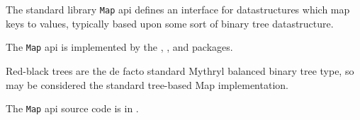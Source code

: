 
The standard library {\tt Map} api defines an interface for datastructures 
which map keys to values, typically based upon some sort of binary tree 
datastructure.

The {\tt Map} api is implemented by the 
, 
, 
 and 
packages.

Red-black trees are the de facto standard Mythryl balanced binary 
tree type, so  may be considered 
the standard tree-based Map implementation.

The {\tt Map} api source code is in .







